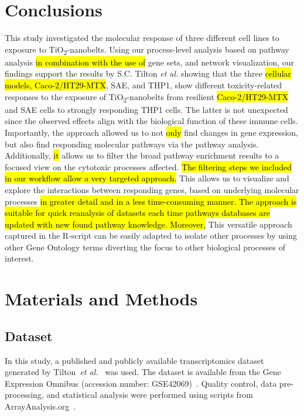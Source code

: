\documentclass[ijms,article,submit,moreauthors,pdftex]{Definitions/mdpi}
\begin{document}
\section{Conclusions}
This study investigated the molecular response of three different cell lines to exposure to TiO\textsubscript{2}-nanobelts. Using our process-level analysis based on pathway analysis \hl{in combination with the use of} gene sets, and network visualization, our findings support the results by S.C. Tilton \textit{et al.} showing that the three \hl{cellular models, Caco-2/HT29-MTX}, SAE, and THP1, show different toxicity-related responses to the exposure of TiO\textsubscript{2}-nanobelts from resilient \hl{Caco-2/HT29-MTX} and SAE cells to strongly responding THP1 cells. The latter is not unexpected since the observed effects align with the biological function of these immune cells. Importantly, the approach allowed us to not \hl{only} find changes in gene expression, but also find responding molecular pathways via the pathway analysis. Additionally, \hl{it} allows us to filter the broad pathway enrichment results to a focused view on the cytotoxic processes affected. \hl{The filtering steps we included in our workflow allow a very targeted approach.} This allows us to visualize and explore the interactions between responding genes, based on underlying molecular processes \hl{in greater detail and in a less time-consuming manner.  The approach is suitable for quick reanalysis of datasets each time pathways databases are updated with new found pathway knowledge. Moreover,} This versatile approach captured in the R-script can be easily adapted to isolate other processes by using other Gene Ontology terms diverting the focus to other biological processes of interest.
\section{Materials and Methods}

\subsection*{Dataset}
In this study, a published and publicly available transcriptomics dataset generated by Tilton~\textit{et al.}~\cite{Tilton2013} was used. The dataset is available from the Gene Expression Omnibus (accession number: GSE42069)~\cite{Edgar2002}. Quality control, data pre-processing, and statistical analysis were performed using scripts from ArrayAnalysis.org~\cite{Eijssen2013}. 
\end{document}

